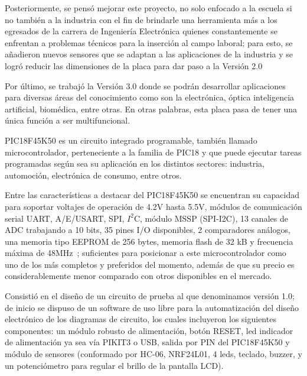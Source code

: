 \documentclass[times, 10pt,twocolumn]{article}
\begin{document}
Posteriormente, se pensó mejorar este proyecto, no solo enfocado a la escuela si no también a la industria con el fin de brindarle una herramienta más a los
egresados de la carrera de Ingeniería Electrónica quienes constantemente se enfrentan a problemas técnicos para la inserción al campo laboral; para esto,
se añadieron nuevos sensores que se adaptan a las aplicaciones de la industria y se logró reducir las dimensiones de la placa para dar paso a la Versión 2.0

Por último, se trabajó la Versión 3.0 donde se podrán desarrollar aplicaciones para diversas áreas del conocimiento como son la electrónica, óptica inteligencia artificial, biomédica, entre otras. En otras palabras, esta placa pasa de tener una única función a ser multifuncional.



PIC18F45K50 es un circuito integrado programable, también llamado microcontrolador, perteneciente a la familia de PIC18 y que puede ejecutar tareas programadas según sea su aplicación en los distintos sectores: industria, automoción, electrónica de consumo, entre otros.

Entre las características a destacar del PIC18F45K50 se encuentran su capacidad para soportar voltajes de operación de 4.2V hasta 5.5V, módulos de comunicación serial UART, A/E/USART, SPI, $I^{2}$C, módulo MSSP (SPI-I2C), 13 canales de ADC trabajando a 10 bits, 35 pines I/O disponibles, 2 comparadores análogos, una memoria tipo EEPROM de 256 bytes, memoria flash de 32 kB y frecuencia máxima de 48MHz~\cite{ex3}; suficientes para posicionar a este microcontrolador como uno de los más completos y preferidos del momento, además de que su precio es considerablemente menor comparado con otros disponibles en el mercado.



Consistió en el diseño de un circuito de prueba al que denominamos versión 1.0; de inicio se dispuso de un software de uso libre para la automatización del diseño electrónico de los diagramas de circuito, los cuales incluyeron los siguientes componentes: un módulo robusto de alimentación, botón RESET, led indicador de alimentación ya sea vía PIKIT3 o USB, salida por PIN del PIC18F45K50 y módulo de sensores (conformado por HC-06, NRF24L01, 4 leds, teclado, buzzer, y un potenciómetro para regular el brillo de la pantalla LCD). 
\end{document}
